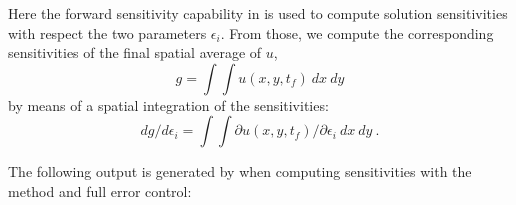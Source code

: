 Here the forward sensitivity capability in {\idas} is used to compute
solution sensitivities with respect the two parameters $\epsilon_i$.
From those, we compute the corresponding sensitivities of the final spatial
average of $u$,
\begin{equation*}
  g = \int \int u(x,y,t_f) ~dx~dy
\end{equation*}
by means of a spatial integration of the sensitivities:
\begin{equation*}
  dg/d\epsilon_i = \int \int \partial u(x,y,t_f) / \partial \epsilon_i~dx~dy ~.
\end{equation*}


The following output is generated by  when computing
sensitivities with the  method and full error control:


